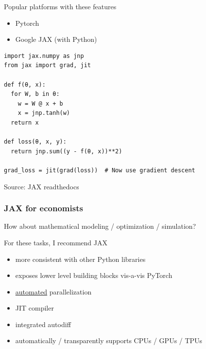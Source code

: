 \documentclass[
    xcolor={svgnames,dvipsnames},
    hyperref={colorlinks, citecolor=DeepPink4, linkcolor=DarkRed, urlcolor=DarkBlue}
    ]{beamer}  %
\newcommand{\1}{\mathbbm 1}
\begin{document}
\begin{frame}
    
    Popular platforms with these features

    \vspace{0.5em}
    \begin{itemize}
        \item Pytorch
        \vspace{0.5em}
        \item Google JAX (with Python)
    \end{itemize}


\end{frame}



\begin{frame}[fragile]
    
    \vspace{-1em}
    \begin{verbatim}
import jax.numpy as jnp
from jax import grad, jit

def f(θ, x):
  for W, b in θ:
    w = W @ x + b
    x = jnp.tanh(w)  
  return x

def loss(θ, x, y):
  return jnp.sum((y - f(θ, x))**2)

grad_loss = jit(grad(loss))  # Now use gradient descent 
    \end{verbatim}

    {\footnotesize Source: JAX readthedocs}

\end{frame}


\begin{frame}
    \frametitle{JAX for economists}

    How about mathematical modeling / optimization / simulation?

    \vspace{0.5em}
    For these tasks, I recommend JAX

    \begin{itemize}
        \item more consistent with other Python libraries
        \vspace{0.5em}
        \item exposes lower level building blocks vis-a-vis PyTorch
        \vspace{0.5em}
        \item \underline{automated} parallelization
        \vspace{0.5em}
        \item JIT compiler 
        \vspace{0.5em}
        \item integrated autodiff
        \vspace{0.5em}
        \item automatically / transparently supports CPUs / GPUs / TPUs 
    \end{itemize}

\end{frame}
\end{document}
